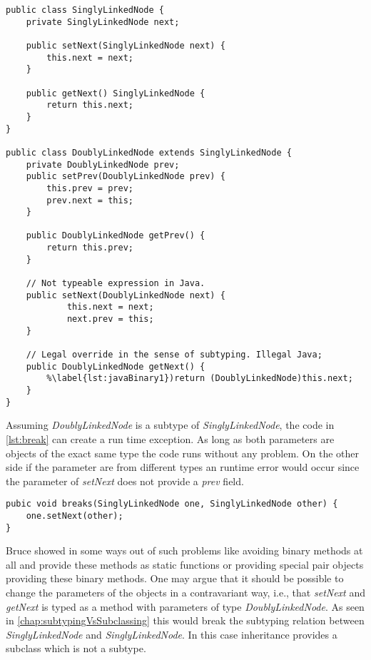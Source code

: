 \begin{lstlisting}[caption={Illegal subtyping of binary methods in Java},label={lst:javaBinary}]
public class SinglyLinkedNode {
	private SinglyLinkedNode next;

	public setNext(SinglyLinkedNode next) {
		this.next = next;
	}

	public getNext() SinglyLinkedNode {
		return this.next;
	}
}

public class DoublyLinkedNode extends SinglyLinkedNode {
	private DoublyLinkedNode prev;
	public setPrev(DoublyLinkedNode prev) {
		this.prev = prev;
		prev.next = this;
	}

	public DoublyLinkedNode getPrev() {
		return this.prev;
	}
	
	// Not typeable expression in Java.
	public setNext(DoublyLinkedNode next) {
			this.next = next;
			next.prev = this;
	}

	// Legal override in the sense of subtyping. Illegal Java;
	public DoublyLinkedNode getNext() {
		%\label{lst:javaBinary1})return (DoublyLinkedNode)this.next;
	}
}
\end{lstlisting}

Assuming \emph{DoublyLinkedNode} is a subtype of \emph{SinglyLinkedNode},
the code in \autoref{lst:break} can create a run time exception. As
long as both parameters are objects of the exact same type the code runs
without any problem. On the other side if the parameter are from different
types an runtime error would occur since the parameter of \emph{setNext}
does not provide a \emph{prev} field.

\begin{lstlisting}[label={lst:break},caption={Breaking a doubly linked node}]
pubic void breaks(SinglyLinkedNode one, SinglyLinkedNode other) {
	one.setNext(other);
}
\end{lstlisting}

Bruce showed in \cite{bruce_binary_1995} some ways out of such problems
like avoiding binary methods at all and provide these methods as static
functions or providing special pair objects providing these binary
methods. One may argue that it should be possible to change the parameters
of the objects in a contravariant way, i.e., that \emph{setNext}
and \emph{getNext} is typed as a method with parameters of type
\emph{DoublyLinkedNode}. As seen in \autoref{chap:subtypingVsSubclassing}
this would break the subtyping relation between \emph{SinglyLinkedNode}
and \emph{SinglyLinkedNode}. In this case inheritance provides a subclass
which is not a subtype.

